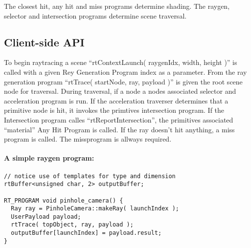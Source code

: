 The closest hit, any hit and miss programs determine shading. The raygen, selector and intersection programs determine scene traversal.
			 
\subsection{Client-side API}

To begin raytracing a scene ``rtContextLaunch( raygenIdx, width, height )'' is called with a given Rey Generation Program index as a parameter. From the ray generation program ``rtTrace( startNode, ray, payload )'' is given the root scene node for traversal. During traversal, if a node a nodes associated selector and acceleration program is run.
If the acceleration traverser determines that a primitive node is hit, it invokes the primtives intersection program.
If the Intersection program calles ``rtReportIntersection'', the primitives associated ``material'' Any Hit Program is called.
If the ray doesn't hit anything, a miss program is called. The missprogram is allways required.

\paragraph{A simple raygen program:}

\begin{verbatim}
// notice use of templates for type and dimension
rtBuffer<unsigned char, 2> outputBuffer; 

RT_PROGRAM void pinhole_camera() {
  Ray ray = PinholeCamera::makeRay( launchIndex );
  UserPayload payload;
  rtTrace( topObject, ray, payload );
  outputBuffer[launchIndex] = payload.result;
}
\end{verbatim}
